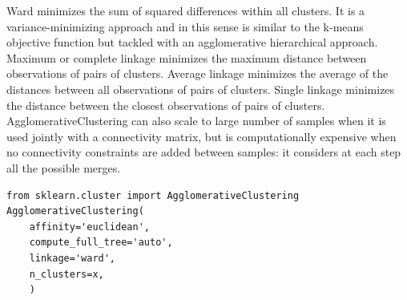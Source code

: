 Ward minimizes the sum of squared differences within all clusters. It is a variance-minimizing approach and in this sense is similar to the k-means objective function but tackled with an agglomerative hierarchical approach.
Maximum or complete linkage minimizes the maximum distance between observations of pairs of clusters.
Average linkage minimizes the average of the distances between all observations of pairs of clusters.
Single linkage minimizes the distance between the closest observations of pairs of clusters.
AgglomerativeClustering can also scale to large number of samples when it is used jointly with a connectivity matrix, but is computationally expensive when no connectivity constraints are added between samples: it considers at each step all the possible merges.


\begin{lstlisting}[style=mypython]
from sklearn.cluster import AgglomerativeClustering
AgglomerativeClustering(
    affinity='euclidean',
    compute_full_tree='auto',
    linkage='ward',
    n_clusters=x,
    )
\end{lstlisting}


